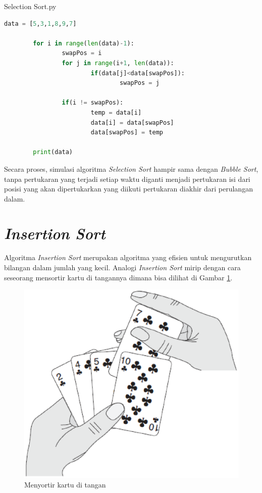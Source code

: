 \begin{listprog}{Selection Sort.py}
	\label{lst:Selection}
	\begin{lstlisting}[language=Python]
		data = [5,3,1,8,9,7]

		for i in range(len(data)-1):
				swapPos = i
				for j in range(i+1, len(data)):
						if(data[j]<data[swapPos]):
								swapPos = j

				if(i != swapPos):
						temp = data[i]
						data[i] = data[swapPos]
						data[swapPos] = temp
				
		print(data)
	\end{lstlisting}
\end{listprog}


Secara proses, simulasi algoritma \textit{Selection Sort} hampir sama dengan \textit{Bubble Sort}, tanpa pertukaran yang terjadi setiap waktu diganti menjadi pertukaran isi dari posisi yang akan dipertukarkan yang diikuti pertukaran diakhir dari perulangan dalam. 

\section{\textit{Insertion Sort}}
Algoritma \textit{Insertion Sort} merupakan algoritma yang efisien untuk mengurutkan bilangan dalam jumlah yang kecil. Analogi \textit{Insertion Sort} mirip dengan cara seseorang mensortir kartu di tangannya dimana bisa dilihat di Gambar \ref{fig:InsertionSort}.

\begin{figure}%
\includegraphics[scale=0.5]{fig/insertionSort.eps}%
\caption{Menyortir kartu di tangan}%
\label{fig:InsertionSort}%
\end{figure}



